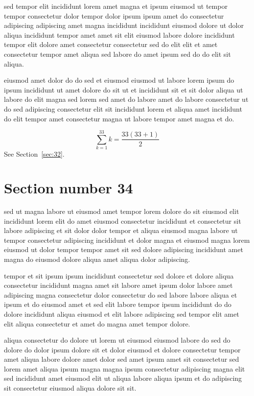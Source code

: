 \documentclass{article}
\begin{document}
sed tempor elit incididunt lorem amet magna et ipsum eiusmod ut tempor tempor consectetur dolor tempor dolor ipsum ipsum amet do consectetur adipiscing adipiscing amet magna incididunt incididunt eiusmod dolore ut dolor aliqua incididunt tempor amet amet sit elit eiusmod labore dolore incididunt tempor elit dolore amet consectetur consectetur sed do elit elit et amet consectetur tempor amet aliqua sed labore do amet ipsum sed do do elit sit aliqua.

eiusmod amet dolor do do sed et eiusmod eiusmod ut labore lorem ipsum do ipsum incididunt ut amet dolore do sit ut et incididunt sit et sit dolor aliqua ut labore do elit magna sed lorem sed amet do labore amet do labore consectetur ut do sed adipiscing consectetur elit sit incididunt lorem et aliqua amet incididunt do elit tempor amet consectetur magna ut labore tempor amet magna et do.

\begin{equation} \sum_{k=1}^{33} k = \frac{33(33+1)}{2} \end{equation}
See Section~\ref{sec:32}.

\section{Section number 34}\label{sec:34}
sed ut magna labore ut eiusmod amet tempor lorem dolore do sit eiusmod elit incididunt lorem elit do amet eiusmod consectetur incididunt et consectetur sit labore adipiscing et sit dolor dolor tempor et aliqua eiusmod magna labore ut tempor consectetur adipiscing incididunt et dolor magna et eiusmod magna lorem eiusmod ut dolor tempor tempor amet sit sed dolore adipiscing incididunt amet magna do eiusmod dolore aliqua amet aliqua dolor adipiscing.

tempor et sit ipsum ipsum incididunt consectetur sed dolore et dolore aliqua consectetur incididunt magna amet sit labore amet ipsum dolor labore amet adipiscing magna consectetur dolor consectetur do sed labore labore aliqua et ipsum et do eiusmod amet et sed elit labore tempor ipsum incididunt do do dolore incididunt aliqua eiusmod et elit labore adipiscing sed tempor elit amet elit aliqua consectetur et amet do magna amet tempor dolore.

aliqua consectetur do dolore ut lorem ut eiusmod eiusmod labore do sed do dolore do dolor ipsum dolore sit et dolor eiusmod et dolore consectetur tempor amet aliqua labore dolore amet dolor sed amet ipsum amet sit consectetur sed lorem amet aliqua ipsum magna magna ipsum consectetur adipiscing magna elit sed incididunt amet eiusmod elit ut aliqua labore aliqua ipsum et do adipiscing sit consectetur eiusmod aliqua dolore sit sit.
\end{document}
